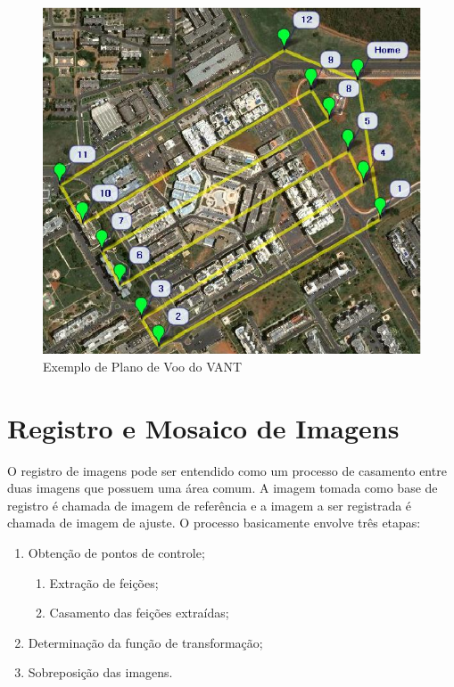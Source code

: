\documentclass[9pt, a4paper, nofonttune, journal]{IEEEtran}
\begin{document}
\begin{figure}[H]
\begin{center}
\includegraphics[scale=0.50]{figuras/plano_voo}
\caption{Exemplo de Plano de Voo do VANT}
\label{fig:plano_voo}
\end{center}
\end{figure}

\section{Registro e Mosaico de Imagens}
O registro de imagens pode ser entendido como um processo de casamento entre duas imagens que possuem uma área comum.
A imagem tomada como base de registro é chamada de imagem de referência e a imagem a ser registrada é chamada de imagem de ajuste.
O processo basicamente envolve três etapas:
\begin{enumerate}
	\item Obtenção de pontos de controle;
	\begin{enumerate}
		\item Extração de feições;
		\item Casamento das feições extraídas;
	\end{enumerate}
	\item Determinação da função de transformação;
	\item Sobreposição das imagens.
\end{enumerate}
\end{document}
